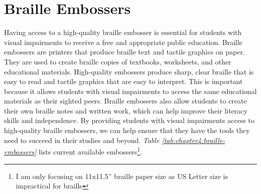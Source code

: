 \section{Braille Embossers}\label{sec:braille-embossers}
Having access to a high-quality braille embosser is essential for students with visual impairments to receive a free and appropriate public education. Braille embossers are printers that produce braille text and tactile graphics on paper. They are used to create braille copies of textbooks, worksheets, and other educational materials. High-quality embossers produce sharp, clear braille that is easy to read and tactile graphics that are easy to interpret. This is important because it allows students with visual impairments to access the same educational materials as their sighted peers. Braille embossers also allow students to create their own braille notes and written work, which can help improve their literacy skills and independence. By providing students with visual impairments access to high-quality braille embossers, we can help ensure that they have the tools they need to succeed in their studies and beyond. \emph{Table \ref{tab:chapter4:braille-embossers}} lists current available embossers\footnote{I am only focusing on 11x11.5'' braille paper size as US Letter size is impractical for braille}.

